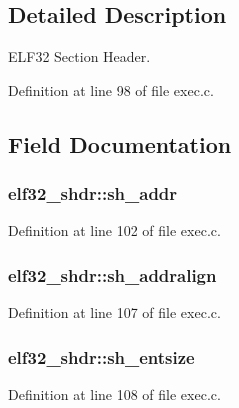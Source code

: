 \subsection{Detailed Description}
E\+L\+F32 Section Header. 

Definition at line 98 of file exec.\+c.



\subsection{Field Documentation}
\hypertarget{structelf32__shdr_a7054ce2ce815d205d451bfe7ce2e145e}{
\subsubsection[{sh\+\_\+addr}]{ elf32\+\_\+shdr\+::sh\+\_\+addr}}\label{structelf32__shdr_a7054ce2ce815d205d451bfe7ce2e145e}


Definition at line 102 of file exec.\+c.

\hypertarget{structelf32__shdr_a74275f49dbae08127832dc1061ed24ab}{
\subsubsection[{sh\+\_\+addralign}]{ elf32\+\_\+shdr\+::sh\+\_\+addralign}}\label{structelf32__shdr_a74275f49dbae08127832dc1061ed24ab}


Definition at line 107 of file exec.\+c.

\hypertarget{structelf32__shdr_a0360b455d1586deda50df0adaa7a87e0}{
\subsubsection[{sh\+\_\+entsize}]{ elf32\+\_\+shdr\+::sh\+\_\+entsize}}\label{structelf32__shdr_a0360b455d1586deda50df0adaa7a87e0}


Definition at line 108 of file exec.\+c.

